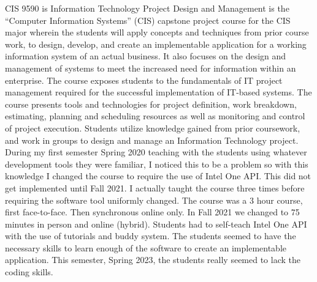
CIS 9590 is Information Technology Project Design and Management is the  ``Computer Information Systems'' (CIS) capstone project course for the CIS major wherein the students will apply concepts and techniques from prior course work, to design, develop, and create an implementable application for a working information system of an actual business. It also focuses on the design and management of systems to meet the increased need for information within an enterprise. The course exposes students to the fundamentals of IT project management required for the successful implementation of IT-based systems. The course presents tools and technologies for project definition, work breakdown, estimating, planning and scheduling resources as well as monitoring and control of project execution. Students utilize knowledge gained from prior coursework, and work in groups to design and manage an Information Technology project.  During my first semester Spring 2020 teaching with the students using whatever development tools they were familiar, I noticed this to be a problem so with this knowledge I changed the course to require the use of Intel One API.  This did not get implemented until Fall 2021.  I actually taught the course three times before requiring the software tool uniformly changed.  The course was a 3 hour course, first face-to-face.  Then synchronous online only.  In Fall 2021 we changed to 75 minutes in person and online (hybrid).  Students had to self-teach Intel One API with the use of tutorials and buddy system.  The students seemed to have the necessary skills to learn enough of the software to create an implementable application.  This semester, Spring 2023, the students really seemed to lack the coding skills.
